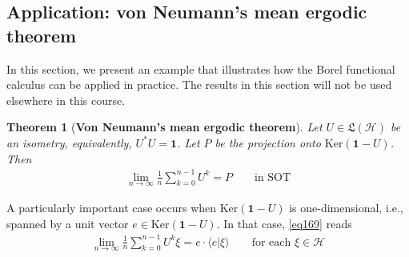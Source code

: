 \documentclass[12pt,b5paper,notitlepage]{article}
\theoremstyle{definition}
\theoremstyle{plain}
\newtheorem{thm}[df]{Theorem}
\newcommand{\fk}{\mathfrak}
\newcommand{\idt}{\mathbf{1}}
\newcommand{\bk}[1]{\langle {#1}\rangle}
\newcommand{\Ker}{\mathrm{Ker}}
\newcommand{\MH}{\mathcal H}
\numberwithin{equation}{section}
\begin{document}
\subsection{Application: von Neumann's mean ergodic theorem}

In this section, we present an example that illustrates how the Borel functional calculus can be applied in practice. The results in this section will not be used elsewhere in this course.



\begin{thm}[\textbf{Von Neumann's mean ergodic theorem}]\label{lb321}
Let $U\in\fk L(\MH)$ be an isometry, equivalently, $U^*U=\idt$. Let $P$ be the projection onto $\Ker(\idt-U)$. Then
\begin{align}\label{eq169}
\lim_{n\rightarrow\infty}\frac 1{n}\sum_{k=0}^{n-1}U^k=P\qquad\text{in SOT}
\end{align}
\end{thm}

A particularly important case occurs when $\Ker(\idt-U)$ is one-dimensional, i.e., spanned by a unit vector $e\in\Ker(\idt-U)$. In that case, \eqref{eq169} reads
\begin{align}
\lim_{n\rightarrow\infty}\frac 1{n}\sum_{k=0}^{n-1}U^k\xi=e\cdot\bk{e|\xi}\qquad\text{for each }\xi\in\MH
\end{align}
\end{document}
